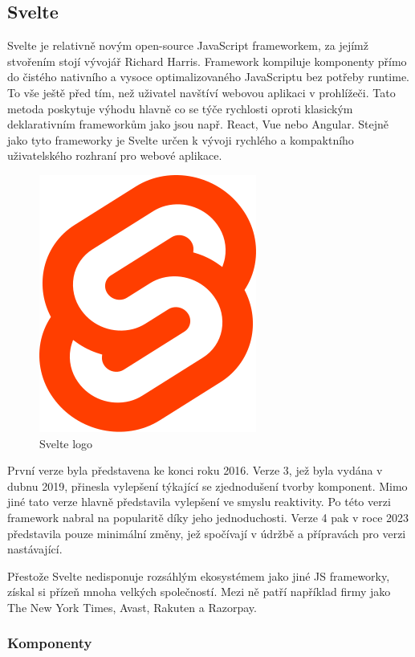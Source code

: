 \subsection{Svelte}

Svelte je relativně novým open-source JavaScript frameworkem, za jejímž stvořením stojí vývojář Richard Harris. 
Framework kompiluje komponenty přímo do čistého nativního a vysoce optimalizovaného JavaScriptu bez potřeby runtime. 
To vše ještě před tím, než uživatel navštíví webovou aplikaci v prohlížeči. 
Tato metoda poskytuje výhodu hlavně co se týče rychlosti oproti klasickým deklarativním frameworkům jako jsou např. React, Vue nebo Angular. 
Stejně jako tyto frameworky je Svelte určen k vývoji rychlého a kompaktního uživatelského rozhraní pro webové aplikace.

\begin{figure}[htb]
	\centering
		\includegraphics[width=.3\textwidth]{images/svelte-logo.png}
	\caption[Svelte logo]{Svelte logo \cite{svelte}}
	\label{fig:sveltelogo}
\end{figure}

První verze byla představena ke konci roku 2016. Verze 3, jež byla vydána v dubnu 2019, přinesla vylepšení týkající se zjednodušení tvorby komponent. 
Mimo jiné tato verze hlavně představila vylepšení ve smyslu reaktivity. Po této verzi framework nabral na popularitě díky jeho jednoduchosti.
Verze 4 pak v roce 2023 představila pouze minimální změny, jež spočívají v údržbě a přípravách pro verzi nastávající.

Přestože Svelte nedisponuje rozsáhlým ekosystémem jako jiné JS frameworky, získal si přízeň mnoha velkých společností. 
Mezi ně patří například firmy jako The New York Times, Avast, Rakuten a Razorpay.\cite{sveltemdn,svelte,sveltedevinterface}

\subsubsection{Komponenty}

